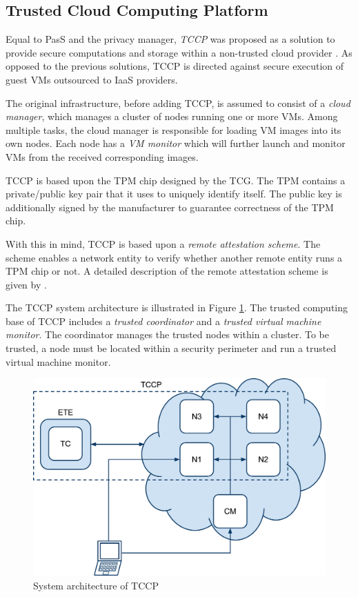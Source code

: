 \documentclass[pdftex,english,10pt,b5paper,twoside]{book}
\begin{document}
\subsection{Trusted Cloud Computing Platform}

Equal to \acl{PasS} and the privacy manager, \emph{\ac{TCCP}} was proposed as a
solution to provide secure computations and storage within a non-trusted cloud
provider \cite{tccp}. As opposed to the previous solutions, \ac{TCCP} is
directed against secure execution of guest \acp{VM} outsourced to \ac{IaaS}
providers. 

The original infrastructure, before adding \ac{TCCP}, is assumed to
consist of a \emph{cloud manager}, which manages a cluster of nodes running one or more
\acp{VM}. Among multiple tasks, the cloud manager is responsible for loading \ac{VM}
images into its own nodes.  Each node has a \emph{\ac{VM} monitor} which will further
launch and monitor \acp{VM} from the received corresponding images.

\ac{TCCP} is based upon the \acf{TPM} chip designed by the \acl{TCG}. The
\ac{TPM} contains a private/public key pair that it uses to uniquely identify
itself. The public key is additionally signed by the manufacturer to guarantee
correctness of the \ac{TPM} chip.

With this in mind, \ac{TCCP} is based upon a \emph{remote attestation scheme}.
The scheme enables a network entity to verify whether another remote entity
runs a \ac{TPM} chip or not. A detailed description of the remote attestation scheme
is given by \citet{tccp}.

The \ac{TCCP} system architecture is illustrated in Figure \ref{fig:RW:TCCP}.
The trusted computing base of \ac{TCCP} includes a \emph{trusted coordinator}
and a \emph{trusted virtual machine monitor}. The coordinator manages the
trusted nodes within a cluster. To be trusted, a node must be located within a
security perimeter and run a trusted virtual machine monitor. 

\begin{figure}[h!]
    \centering
    \includegraphics[scale=0.4]{ArchitectureTCCP.pdf}
    \caption{System architecture of TCCP}
    \label{fig:RW:TCCP}
\end{figure}
\end{document}
